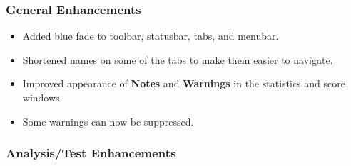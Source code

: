 \documentclass[
]{book}
\providecommand{\tightlist}{%
  \setlength{\itemsep}{0pt}\setlength{\parskip}{0pt}}
\theoremstyle{definition}
\theoremstyle{definition}
\theoremstyle{definition}
\theoremstyle{definition}
\theoremstyle{remark}
\begin{document}
\hypertarget{general-enhancements-4}{%
\subsubsection*{General Enhancements}\label{general-enhancements-4}}

\begin{itemize}
\tightlist
\item
  Added blue fade to toolbar, statusbar, tabs, and menubar.
\item
  Shortened names on some of the tabs to make them easier to navigate.
\item
  Improved appearance of \textbf{Notes} and \textbf{Warnings} in the statistics and score windows.
\item
  Some warnings can now be suppressed.
\end{itemize}

\hypertarget{analysistest-enhancements-4}{%
\subsubsection*{Analysis/Test Enhancements}\label{analysistest-enhancements-4}}
\end{document}
